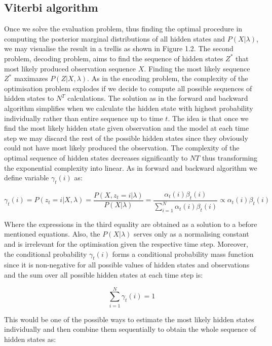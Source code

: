 \subsection{Viterbi algorithm}

Once we solve the evaluation problem, thus finding the optimal procedure in computing the posterior marginal distributions of all hidden states and $P(X|\lambda)$, we may visualise the result in a trellis as shown in Figure 1.2. The second problem, decoding problem, aims to find the sequence of hidden states $Z^*$ that most likely produced observation sequence $X$. Finding the most likely sequence $Z^*$ maximazes $P(Z|X,\lambda)$. As in the encoding problem, the complexity of the optimisation problem explodes if we decide to compute all possible sequences of hidden states to $N^T$ calculations. The solution as in the forward and backward algorithm simplifies when we calculate the hidden state with highest probability individually rather than entire sequence up to time $t$. The idea is that once we find the most likely hidden state given observation and the model at each time step we may discard the rest of the possible hidden states since they obviously could not have most likely produced the observation. The complexity of the optimal sequence of hidden states decreases significantly to $NT$ thus transforming the exponential complexity into linear. As in forward and backward algorithm we define variable $\gamma_t(i)$ as:

\begin{equation}
\gamma_t(i) = P(z_t=i|X,\lambda) = \frac{P(X,z_t=i|\lambda)}{P(X|\lambda)} =\frac{\alpha_t(i) \beta_t(i)}{\sum_{i=1}^N \alpha_t(i) \beta_t(i)} \propto \alpha_t(i) \beta_t(i)
\end{equation}

Where the expressions in the third equality are obtained as a solution to a before mentioned equations. Also, the $P(X|\lambda)$ serves only as a normalising constant and is irrelevant for the optimisation given the respective time step. Moreover, the conditional probability $\gamma_t(i)$ forms a conditional probability mass function since it is non-negative for all possible values of hidden states and observations and the sum over all possible hidden states at each time step is:

\begin{equation}
\sum_{i=1}^N  \gamma_t(i) = 1
\end{equation}

This would be one of the possible ways to estimate the most likely hidden states individually and then combine them sequentially to obtain the whole sequence of hidden states as:

